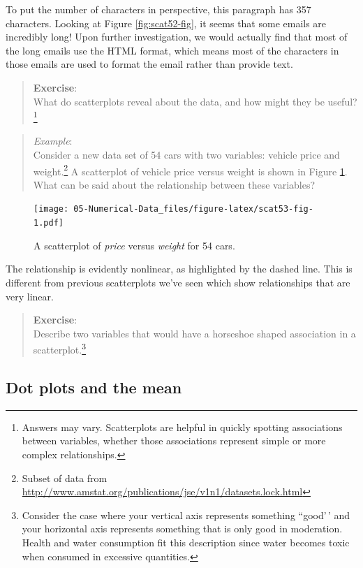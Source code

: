 \documentclass[
]{book}
\begin{document}
To put the number of characters in perspective, this paragraph has 357 characters. Looking at Figure \ref{fig:scat52-fig}, it seems that some emails are incredibly long! Upon further investigation, we would actually find that most of the long emails use the HTML format, which means most of the characters in those emails are used to format the email rather than provide text.

\pagebreak

\begin{quote}
\textbf{Exercise}:\\
What do scatterplots reveal about the data, and how might they be useful?\footnote{Answers may vary. Scatterplots are helpful in quickly spotting associations between variables, whether those associations represent simple or more complex relationships.}
\end{quote}

\begin{quote}
\emph{Example}:\\
Consider a new data set of 54 cars with two variables: vehicle price and weight.\footnote{Subset of data from \url{http://www.amstat.org/publications/jse/v1n1/datasets.lock.html}} A scatterplot of vehicle price versus weight is shown in Figure \ref{fig:scat53-fig}. What can be said about the relationship between these variables?
\end{quote}

\begin{figure}
\centering
\texttt{[image: 05-Numerical-Data\_files/figure-latex/scat53-fig-1.pdf]}
\caption{\label{fig:scat53-fig}A scatterplot of \emph{price} versus \emph{weight} for 54 cars.}
\end{figure}

The relationship is evidently nonlinear, as highlighted by the dashed line. This is different from previous scatterplots we've seen which show relationships that are very linear.

\begin{quote}
\textbf{Exercise}:\\
Describe two variables that would have a horseshoe shaped association in a scatterplot.\footnote{Consider the case where your vertical axis represents something ``good'\,' and your horizontal axis represents something that is only good in moderation. Health and water consumption fit this description since water becomes toxic when consumed in excessive quantities.}
\end{quote}

\hypertarget{dot-plots-and-the-mean}{%
\subsection{Dot plots and the mean}\label{dot-plots-and-the-mean}}
\end{document}
